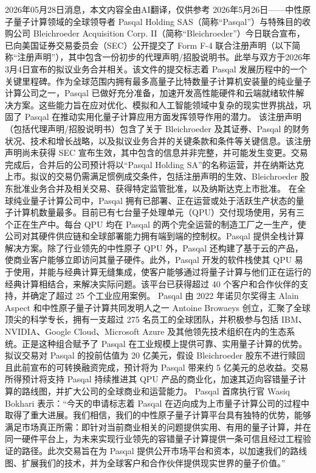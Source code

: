 \documentclass[12pt,a4paper]{ctexart}
\begin{document}
2026年05月28日消息，本文内容全由AI翻译，仅供参考
2026年5月26日——中性原子量子计算领域的全球领导者 Pasqal Holding SAS（简称“Pasqal”）与特殊目的收购公司 Bleichroeder Acquisition Corp. II（简称“Bleichroeder”）今日联合宣布，已向美国证券交易委员会（SEC）公开提交了 Form F-4 联合注册声明（以下简称“注册声明”），其中包含一份初步的代理声明/招股说明书。此举与双方于2026年3月4日宣布的拟议业务合并相关。该文件的提交标志着 Pasqal 发展历程中的一个关键里程碑。作为全球范围内拥有最多高量子比特数量子计算机安装量的纯业量子计算公司之一，Pasqal 已做好充分准备，加速开发高性能硬件和云端就绪软件解决方案。这些能力旨在应对优化、模拟和人工智能领域中复杂的现实世界挑战，巩固了 Pasqal 在推动实用化量子计算应用方面发挥领导作用的潜力。
该注册声明（包括代理声明/招股说明书）包含了关于 Bleichroeder 及其证券、Pasqal 的财务状况、技术和增长战略，以及拟议业务合并的关键条款和条件等关键信息。该注册声明尚未获得 SEC 宣布生效，其中包含的信息并非完整，并可能发生变更。交易完成后，合并后的公司预计将以“Pasqal Holding SA”的名称运营，并在纳斯达克上市。拟议的交易仍需满足惯例成交条件，包括注册声明的生效、Bleichroeder 股东批准业务合并及相关交易、获得特定监管批准，以及纳斯达克上市批准。
在全球纯业量子计算公司中，Pasqal 拥有已部署、正在运营或处于活跃生产状态的量子计算机数量最多。目前已有七台量子处理单元（QPU）交付现场使用，另有三个正在生产中。每台 QPU 均在 Pasqal 的两个完全运营的制造工厂之一生产，使公司对其硬件供应链和全球部署能力拥有端到端的控制权。Pasqal 提供全栈计算解决方案。除了行业领先的中性原子 QPU 外，Pasqal 还构建了基于云的产品，使商业客户能够立即访问其量子硬件。此外，Pasqal 开发的软件栈使其 QPU 易于使用，并能与经典计算无缝集成，使客户能够通过将量子计算与他们正在运行的经典计算相结合，来解决实际问题。该平台已获得超过 40 个客户和合作伙伴的支持，并确定了超过 25 个工业应用案例。
Pasqal 由 2022 年诺贝尔奖得主 Alain Aspect 和中性原子量子计算共同发明人之一 Antoine Browaeys 创立，汇聚了全球顶尖的科学专长，拥有一支超过 275 名员工的全球团队，并积极参与包括 IBM、NVIDIA、Google Cloud、Microsoft Azure 及其他领先技术组织在内的生态系统。正是这种组合赋予了 Pasqal 在工业规模上提供可靠、实用量子计算的优势。
拟议交易对 Pasqal 的投前估值为 20 亿美元，假设 Bleichroeder 股东不进行赎回且此前宣布的可转换融资完成，预计将为 Pasqal 带来约 5 亿美元的总收益。交易所得预计将支持 Pasqal 持续推进其 QPU 产品的商业化，加速其迈向容错量子计算的路线图，并扩大公司的全球商业和运营能力。
Pasqal 首席执行官 Wasiq Bokhari 表示：“今天的申请标志着 Pasqal 在迈向成为上市量子计算公司的过程中取得了重大进展。我们相信，我们的中性原子量子计算平台具有独特的优势，能够满足市场真正所需：即针对当前商业相关的问题提供实用、有用的量子计算，并在同一硬件平台上，为未来实现行业领先的容错量子计算提供一条可信且经过工程验证的路径。此次交易旨在为 Pasqal 提供公开市场平台和资本，以加速我们的路线图、扩展我们的技术，并为全球客户和合作伙伴提供现实世界的量子价值。”
\end{document}
